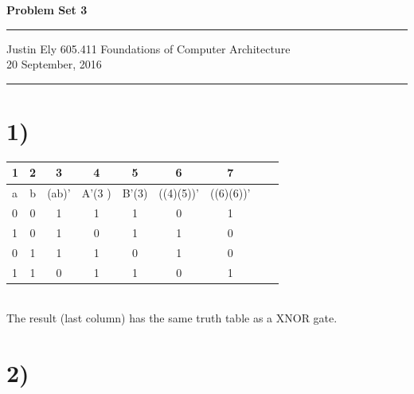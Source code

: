 \documentclass[a4paper,11pt]{article}
\begin{document}
\begin{flushright}

\vspace{1.1cm}

{\bf\Huge Problem Set 3}

\rule{0.25\linewidth}{0.5pt}

\vspace{0.5cm}
Justin Ely
\linebreak
\newline
\footnotesize{605.411 Foundations of Computer Architecture \\}
\vspace{0.5cm}
20 September, 2016
\end{flushright}

\noindent\rule{\linewidth}{1.0pt}


\section*{1)}
\begin{tabular}{| l | c | c | c | c | c | c | c | c |}
  \hline	
    1 & 2 & 3 & 4 & 5 & 6 & 7  \\  \hline \hline
    a & b & (ab)' & A'(3 )& B'(3) & ((4)(5))' & ((6)(6))'  \\  \hline \hline
    0 & 0 & 1 & 1 & 1 & 0 & 1  \\  \hline 
    1 & 0 & 1 & 0 & 1 & 1 & 0  \\  \hline 
    0 & 1 & 1 & 1 & 0 & 1 & 0  \\  \hline 
    1 & 1 & 0 & 1 & 1 & 0 & 1  \\  \hline 
\end{tabular} \\

\noindent  The result (last column) has the same truth table as a XNOR gate.


\section*{2)} 


\end{document}
